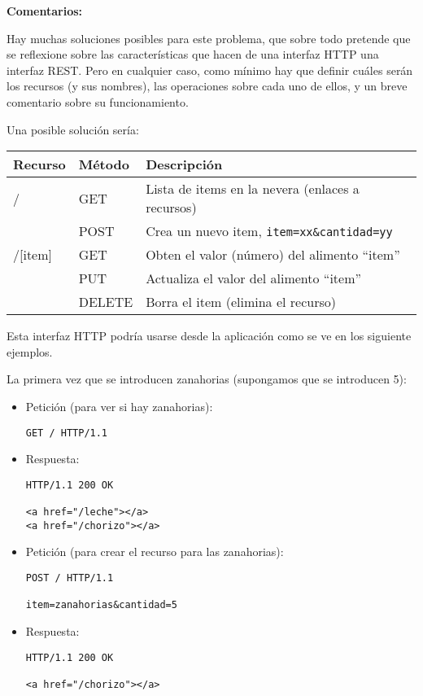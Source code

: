 \textbf{Comentarios:}

Hay muchas soluciones posibles para este problema, que sobre todo pretende que se reflexione sobre las características que hacen de una interfaz HTTP una interfaz REST. Pero en cualquier caso, como mínimo hay que definir cuáles serán los recursos (y sus nombres), las operaciones sobre cada uno de ellos, y un breve comentario sobre su funcionamiento.

Una posible solución sería: \\

\begin{tabular}{l|l|p{10cm}}
  Recurso & Método & Descripción \\ \hline \hline
  /       & GET    & Lista de items en la nevera (enlaces a recursos) \\
          & POST   & Crea un nuevo item, \verb|item=xx&cantidad=yy| \\
  /[item] & GET    & Obten el valor (número) del alimento ``item'' \\
          & PUT    & Actualiza el valor del alimento ``item'' \\
          & DELETE & Borra el item (elimina el recurso) \\
\end{tabular}

Esta interfaz HTTP podría usarse desde la aplicación como se ve en los siguiente ejemplos.

La primera vez que se introducen zanahorias (supongamos que se introducen 5):

\begin{itemize}
\item Petición (para ver si hay zanahorias):
\begin{verbatim}
GET / HTTP/1.1
\end{verbatim}

\item Respuesta:
\begin{verbatim}
HTTP/1.1 200 OK

<a href="/leche"></a>
<a href="/chorizo"></a>
\end{verbatim}

\item Petición (para crear el recurso para las zanahorias):
\begin{verbatim}
POST / HTTP/1.1

item=zanahorias&cantidad=5
\end{verbatim}

\item Respuesta:
\begin{verbatim}
HTTP/1.1 200 OK

<a href="/chorizo"></a>
\end{verbatim}

\end{itemize}

